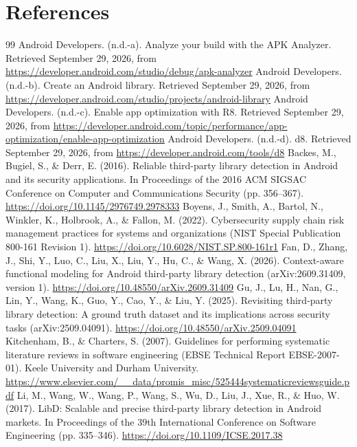 \documentclass[10pt,twocolumn]{article}
\begin{document}
\section*{References}
\begin{thebibliography}{99}
 Android Developers. (n.d.-a). Analyze your build with the APK Analyzer. Retrieved September 29, 2026, from \url{https://developer.android.com/studio/debug/apk-analyzer}
 Android Developers. (n.d.-b). Create an Android library. Retrieved September 29, 2026, from \url{https://developer.android.com/studio/projects/android-library}
 Android Developers. (n.d.-c). Enable app optimization with R8. Retrieved September 29, 2026, from \url{https://developer.android.com/topic/performance/app-optimization/enable-app-optimization}
 Android Developers. (n.d.-d). d8. Retrieved September 29, 2026, from \url{https://developer.android.com/tools/d8}
 Backes, M., Bugiel, S., \& Derr, E. (2016). Reliable third-party library detection in Android and its security applications. In Proceedings of the 2016 ACM SIGSAC Conference on Computer and Communications Security (pp. 356–367). \url{https://doi.org/10.1145/2976749.2978333}
 Boyens, J., Smith, A., Bartol, N., Winkler, K., Holbrook, A., \& Fallon, M. (2022). Cybersecurity supply chain risk management practices for systems and organizations (NIST Special Publication 800-161 Revision 1). \url{https://doi.org/10.6028/NIST.SP.800-161r1}
 Fan, D., Zhang, J., Shi, Y., Luo, C., Liu, X., Liu, Y., Hu, C., \& Wang, X. (2026). Context-aware functional modeling for Android third-party library detection (arXiv:2609.31409, version 1). \url{https://doi.org/10.48550/arXiv.2609.31409}
 Gu, J., Lu, H., Nan, G., Lin, Y., Wang, K., Guo, Y., Cao, Y., \& Liu, Y. (2025). Revisiting third-party library detection: A ground truth dataset and its implications across security tasks (arXiv:2509.04091). \url{https://doi.org/10.48550/arXiv.2509.04091}
 Kitchenham, B., \& Charters, S. (2007). Guidelines for performing systematic literature reviews in software engineering (EBSE Technical Report EBSE-2007-01). Keele University and Durham University. \url{https://www.elsevier.com/\_\_data/promis\_misc/525444systematicreviewsguide.pdf}
 Li, M., Wang, W., Wang, P., Wang, S., Wu, D., Liu, J., Xue, R., \& Huo, W. (2017). LibD: Scalable and precise third-party library detection in Android markets. In Proceedings of the 39th International Conference on Software Engineering (pp. 335–346). \url{https://doi.org/10.1109/ICSE.2017.38}

\end{thebibliography}
\end{document}
